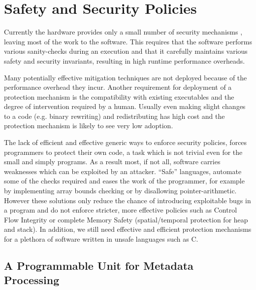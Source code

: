 \chapter{Safety and Security Policies}\label{ch:policies}
Currently the hardware provides only a small number of security mechanisms , 
leaving most of the work to the software. This requires that the software 
performs various sanity-checks during an execution and that it carefully 
maintains various safety and security invariants, resulting in high runtime 
performance overheads.  

Many potentially effective mitigation techniques are not deployed because of the
performance overhead they incur. Another requirement for deployment of a 
protection mechanism is the compatibility with existing executables and 
the degree of intervention required by a human. 
Usually even making slight changes to a code (e.g. binary rewriting) and 
redistributing has high cost and the protection mechanism is likely to see very
low adoption. 

The lack of efficient and effective generic ways to enforce security policies, 
forces programmers to protect their own code, a task which is not trivial even 
for the small and simply programs. As a result most, if not all, software 
carries weaknesses which can be exploited by an attacker. ``Safe'' languages, 
automate some of the checks required and eases the work of the programmer,
for example by implementing array bounds checking or by disallowing 
pointer-arithmetic. However these solutions only reduce the chance of 
introducing exploitable bugs in a program and do not enforce stricter, 
more effective policies such as Control Flow Integrity
or complete Memory Safety (spatial/temporal protection for heap and stack). 
In addition, we still need effective and efficient protection mechanisms for a 
plethora of software written in unsafe languages such as C.

\section{A Programmable Unit for Metadata Processing}\label{sec:pump}

